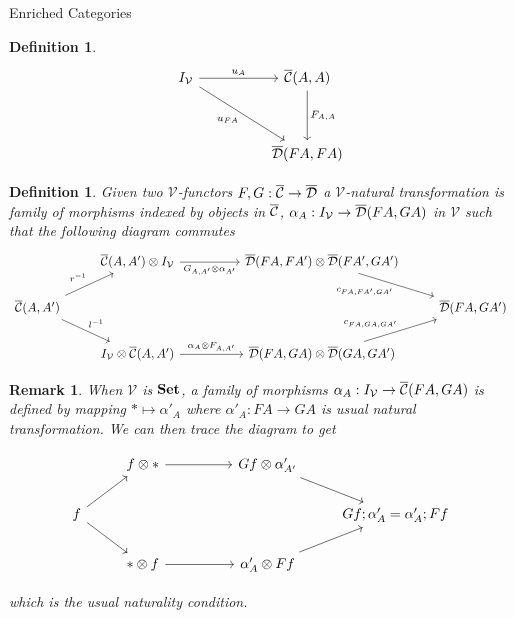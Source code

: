 \documentclass[acmsmall, screen, nonacm]{acmart}
\newtheorem{definition}[theorem]{Definition}
\newtheorem{remark}[theorem]{Remark}
\begin{document}
\begin{section}{Enriched Categories}
\begin{definition}
\[
\begin{tikzcd}
	I_{\mathcal{V}} && {\enriched{C}(A,A)} \\
	\\
	&& {\enriched{D}(FA,FA)}
	\arrow["{u_{A}}", from=1-1, to=1-3]
	\arrow["{u_{FA}}"', from=1-1, to=3-3]
	\arrow["{F_{A,A}}", from=1-3, to=3-3]
\end{tikzcd}
\]
\end{definition}

\begin{definition}
  Given two $\mathcal{V}$-functors $F,G : {\overline{\mathcal{C}}} \to {\overline{\mathcal{D}}}$ a $\mathcal{V}$-natural transformation is family of morphisms indexed by objects in ${\overline{\mathcal{C}}}$, $\alpha_{A} : I_{\mathcal{V}} \to {\overline{\mathcal{D}}}(FA,GA)$ in $\mathcal{V}$ such that the following diagram commutes
  \[
  \begin{tikzcd}
	& {\enriched{C}(A,A')\otimes I_{\mathcal{V}}} && {\enriched{D}(FA,FA') \otimes \enriched{D}(FA',GA')} \\
	{\enriched{C}(A,A')} &&&& {\enriched{D}(FA,GA')} \\
	& {I_{\mathcal{V}} \otimes \enriched{C}(A,A')} && {\enriched{D}(FA,GA) \otimes \enriched{D}(GA,GA')}
	\arrow["{G_{A,A'}\otimes \alpha_{A'}}"', from=1-2, to=1-4]
	\arrow["{c_{FA,FA',GA'}}"', from=1-4, to=2-5]
	\arrow["{r^{-1}}", from=2-1, to=1-2]
	\arrow["{l^{-1}}", from=2-1, to=3-2]
	\arrow["{\alpha_{A} \otimes F_{A,A'}}", from=3-2, to=3-4]
	\arrow["{c_{FA,GA,GA'}}", from=3-4, to=2-5]
\end{tikzcd}
\]
\end{definition}

\begin{remark}
  When $\mathcal{V}$ is $\mathbf{Set}$, a family of morphisms $\alpha_{A} : I_{\mathcal{V}} \to {\overline{\mathcal{C}}}(FA,GA)$ is defined by mapping $* \mapsto \alpha'_{A}$ where $\alpha'_{A} : FA \to GA$ is usual natural transformation.
  We can then trace the diagram to get

\[\begin{tikzcd}
	& {f \otimes *} && {Gf \otimes \alpha'_{A'}} \\
	f &&&& {Gf;\alpha'_{A} = \alpha'_{A};Ff} \\
	& {* \otimes f} && {\alpha'_{A} \otimes Ff}
	\arrow[from=1-2, to=1-4]
	\arrow[from=1-4, to=2-5]
	\arrow[from=2-1, to=1-2]
	\arrow[from=2-1, to=3-2]
	\arrow[from=3-2, to=3-4]
	\arrow[from=3-4, to=2-5]
\end{tikzcd}\]

which is the usual naturality condition.


\end{remark}
\end{section}
\end{document}
